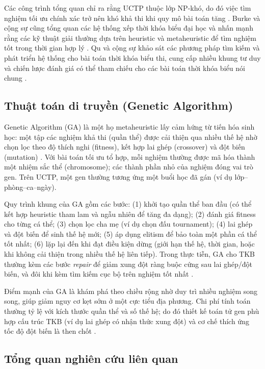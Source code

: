 \documentclass[a4paper,12pt,oneside]{article}
\begin{document}
	Các công trình tổng quan chỉ ra rằng UCTP thuộc lớp NP-khó, do đó việc tìm nghiệm tối ưu chính xác trở nên khó khả thi khi quy mô bài toán tăng \cite{schaerf1999survey,lewis2008survey}. Burke và cộng sự cũng tổng quan các hệ thống xếp thời khóa biểu đại học và nhấn mạnh rằng các kỹ thuật giải thường dựa trên heuristic và metaheuristic để tìm nghiệm tốt trong thời gian hợp lý \cite{burke1997automated}. Qu và cộng sự khảo sát các phương pháp tìm kiếm và phát triển hệ thống cho bài toán thời khóa biểu thi, cung cấp nhiều khung tư duy và chiến lược đánh giá có thể tham chiếu cho các bài toán thời khóa biểu nói chung \cite{qu2009survey}.
	
	\subsection{Thuật toán di truyền (Genetic Algorithm)}
	
	Genetic Algorithm (GA) là một họ metaheuristic lấy cảm hứng từ tiến hóa sinh học: một tập các nghiệm khả thi (quần thể) được cải thiện qua nhiều thế hệ nhờ chọn lọc theo độ thích nghi (fitness), kết hợp lai ghép (crossover) và đột biến (mutation) \cite{burke1997automated,lewis2008survey}. Với bài toán tối ưu tổ hợp, mỗi nghiệm thường được mã hóa thành một nhiệm sắc thể (chromosome); các thành phần nhỏ của nghiệm đóng vai trò gen. Trên UCTP, một gen thường tương ứng một buổi học đã gán (ví dụ lớp--phòng--ca--ngày).
	
	Quy trình khung của GA gồm các bước: (1) khởi tạo quần thể ban đầu (có thể kết hợp heuristic tham lam và ngẫu nhiên để tăng đa dạng); (2) đánh giá fitness cho từng cá thể; (3) chọn lọc cha mẹ (ví dụ chọn đấu tournament); (4) lai ghép và đột biến để sinh thế hệ mới; (5) áp dụng elitism để bảo toàn một phần cá thể tốt nhất; (6) lặp lại đến khi đạt điều kiện dừng (giới hạn thế hệ, thời gian, hoặc khi không cải thiện trong nhiều thế hệ liên tiếp). Trong thực tiễn, GA cho TKB thường kèm các bước \textit{repair} để giảm xung đột ràng buộc cứng sau lai ghép/đột biến, và đôi khi kèm tìm kiếm cục bộ trên nghiệm tốt nhất \cite{burke1997automated}.
	
	Điểm mạnh của GA là khám phá theo chiều rộng nhờ duy trì nhiều nghiệm song song, giúp giảm nguy cơ kẹt sớm ở một cực tiểu địa phương. Chi phí tính toán thường tỷ lệ với kích thước quần thể và số thế hệ; do đó thiết kế toán tử gen phù hợp cấu trúc TKB (ví dụ lai ghép có nhận thức xung đột) và cơ chế thích ứng tốc độ đột biến là then chốt \cite{lewis2008survey}.
	
	\subsection{Tổng quan nghiên cứu liên quan}
	
\end{document}

